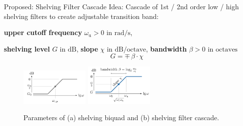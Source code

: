 \documentclass[mathserif,aspectratio=169]{beamer}
\begin{document}
\begin{frame}{Proposed: Shelving Filter Cascade}
Idea: Cascade of 1st / 2nd order low / high shelving filters to create
adjustable transition band:

\small
\textbf{upper cutoff frequency} $\omega_\mathrm{u}>0$ in $\mathrm{rad/s}$,

\textbf{shelving level} $G$ in $\mathrm{dB}$,\quad
\textbf{slope} $\chi$ in $\mathrm{dB/octave}$,\quad
\textbf{bandwidth} $\beta>0$ in $\mathrm{octaves}$
\normalsize
\begin{equation*}
G = \mp\,\beta \cdot \chi
\end{equation*}
%
%
%
\begin{figure}
\centering
{}
{\includegraphics[width=0.3\textwidth]{Fig1b.png}}
{\includegraphics[width=0.3\textwidth]{Fig1c.png}}
\caption{Parameters of (a) shelving biquad and (b) shelving filter
cascade.}\label{Fig:1}
\end{figure}
\end{frame}
%
%
%
\end{document}
